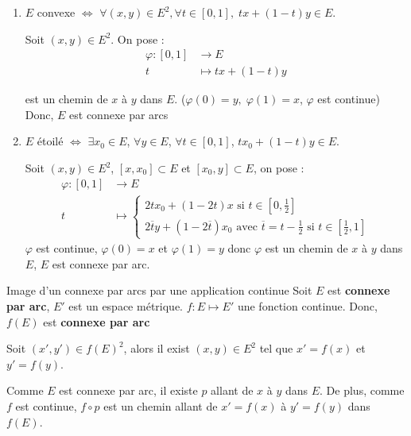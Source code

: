 \begin{myproof}
\begin{enumerate}
    \item $E$ convexe  $\iff$ $\forall (x,y) \in E^{2}, \forall t \in [0,1], \; tx+(1-t)y \in E$.

    Soit $(x,y) \in E^{2}$. On pose :
    \begin{align*}
        \varphi : [0, 1] &\to E \\
        t &\mapsto tx+(1-t)y
    \end{align*}

    est un chemin de $x$ à $y$ dans $E$. ($\varphi(0)=y,\; \varphi(1)=x$,  $\varphi$ est continue)
   Donc, $E$ est connexe par arcs

\item $E$ étoilé $\iff$ $\exists x_0 \in E$, $\forall  y \in E$, $\forall t \in [0,1]$, $tx_0 + (1-t)y \in E$.

    Soit $(x,y)\in E^{2}$, $[x, x_0] \subset E$ et $[x_0, y] \subset E$, on pose :
    \begin{align*}
        \varphi : [0,1] &\to E \\
        t &\mapsto \begin{cases}
            2tx_0 + (1-2t)x \text{ si } t \in [0, \frac{1}{2} ] \\
            2 \overline{t} y + (1- 2 \overline{t}) x_0 \text{ avec } \overline{t} = t - \frac{1}{2} \text{ si } t \in [\frac{1}{2} , 1]
        \end{cases}
    \end{align*}
    $\varphi$ est continue, $\varphi(0)=x$ et  $\varphi(1)=y$ donc  $\varphi$ est un chemin de $x$ à  $y$ dans $E$, $E$ est connexe par arc.
\end{enumerate}
\end{myproof}
\begin{Prop}{Image d'un connexe par arcs par une application continue}{}
Soit $E$ est \textbf{connexe par arc}, $E'$ est un espace métrique.  $f:E \mapsto E'$ une fonction continue. Donc,
\center
$f(E)$ est \textbf{connexe par arc}
\end{Prop}

\begin{myproof}{}{}
Soit $(x', y') \in f(E) ^{2}$, alors il exist $(x, y)\in E ^{2}$ tel que $x'= f(x)$ et $y'=f(y)$. 

Comme $E$ est connexe par arc, il existe $p$ allant de $x$ à $y$ dans $E$. De plus, comme $f$ est continue, $f \circ p$ est un chemin allant de $x'= f(x)$ à $y'=f(y)$ dans $f(E)$.
\end{myproof}


